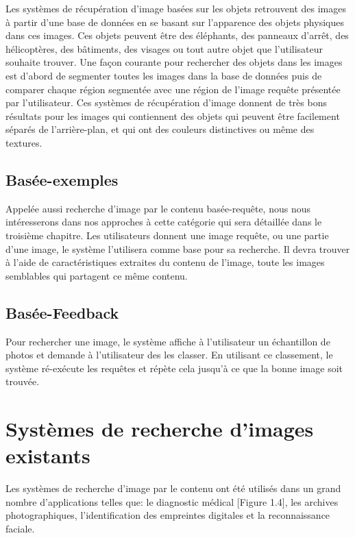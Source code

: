 	Les systèmes de récupération d'image basées sur les objets retrouvent des images à partir d'une base de données en se basant sur l'apparence des objets physiques dans ces images. Ces objets peuvent être des éléphants, des panneaux d'arrêt, des hélicoptères, des bâtiments, des visages ou tout autre objet que l'utilisateur souhaite trouver. Une façon courante pour rechercher des objets dans les images est d'abord de segmenter toutes les images dans la base de données puis de comparer chaque région segmentée avec une région de l'image requête présentée par l'utilisateur. Ces systèmes de récupération d'image donnent de très bons résultats pour les images qui contiennent des objets qui peuvent être facilement séparés de l'arrière-plan, et qui ont des couleurs distinctives ou même des textures.

\subsection{Basée-exemples}

	Appelée aussi recherche d'image par le contenu basée-requête, nous nous intéresserons dans nos approches à cette catégorie qui sera détaillée dans le troisième chapitre. Les utilisateurs donnent une image requête, ou une partie d'une image, le système l'utilisera comme base pour sa recherche. Il devra trouver à l'aide de caractéristiques extraites du contenu de l'image, toute les images semblables qui partagent ce même contenu.


\subsection{Basée-Feedback}
	Pour rechercher une image, le système affiche à l'utilisateur un échantillon de photos et demande à l'utilisateur des les classer. En utilisant ce classement, le système ré-exécute les requêtes et répète cela jusqu'à ce que la bonne image soit trouvée.

\section{Systèmes de recherche d'images existants}

	Les systèmes de recherche d'image par le contenu ont été utilisés dans un grand nombre d'applications telles que: le diagnostic médical [Figure 1.4], les archives photographiques, l'identification des empreintes digitales et la reconnaissance faciale.


